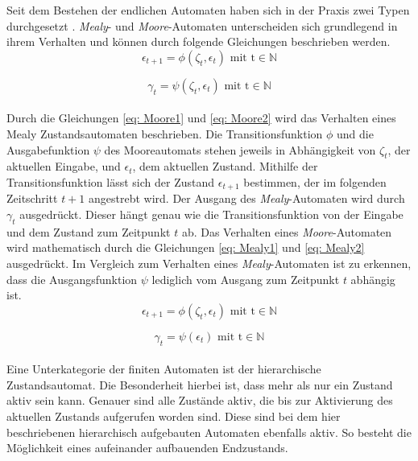 	Seit dem Bestehen der endlichen Automaten haben sich in der Praxis zwei Typen durchgesetzt \cite{mooremealy}. \textit{Mealy}- und \textit{Moore}-Automaten unterscheiden sich grundlegend in ihrem Verhalten und können durch folgende Gleichungen beschrieben werden.\\
	
	\begin{equation}
		\epsilon_{t+1}=\phi(\zeta_t,\epsilon_t)\text{    mit    t}\in\mathbb{N}
		\label{eq: Moore1}
	\end{equation}

	\begin{equation}
		\gamma_t=\psi(\zeta_t,\epsilon_t)\text{    mit    t}\in\mathbb{N}
		\label{eq: Moore2}
	\end{equation}
	\\
	Durch die Gleichungen \ref{eq: Moore1} und \ref{eq: Moore2} wird das Verhalten eines Mealy Zustandsautomaten beschrieben. Die Transitionsfunktion $\phi$ und die Ausgabefunktion $\psi$ des Mooreautomats stehen jeweils in Abhängigkeit von $\zeta_t $, der aktuellen Eingabe, und $\epsilon_t$, dem aktuellen Zustand. Mithilfe der Transitionsfunktion lässt sich der Zustand $\epsilon_{t+1}$ bestimmen, der im folgenden Zeitschritt $t+1$ angestrebt wird. Der Ausgang des \textit{Mealy}-Automaten wird durch $\gamma_t$ ausgedrückt. Dieser hängt genau wie die Transitionsfunktion von der Eingabe und dem Zustand zum Zeitpunkt $t$ ab. Das Verhalten eines \textit{Moore}-Automaten wird mathematisch durch die Gleichungen \ref{eq: Mealy1} und \ref{eq: Mealy2} ausgedrückt. Im Vergleich zum Verhalten eines \textit{Mealy}-Automaten ist zu erkennen, dass die Ausgangsfunktion $\psi$ lediglich vom Ausgang zum Zeitpunkt $t$ abhängig ist.  \cite{mooremealy}\\
	
	\begin{equation}
		\epsilon_{t+1}=\phi(\zeta_t,\epsilon_t)\text{    mit    t}\in\mathbb{N}
		\label{eq: Mealy1}
	\end{equation}
	
	\begin{equation}
		\gamma_t=\psi(\epsilon_t)\text{    mit    t}\in\mathbb{N}
		\label{eq: Mealy2}
	\end{equation}
	\\
	
	
	Eine Unterkategorie der finiten Automaten ist der hierarchische Zustandsautomat. Die Besonderheit hierbei ist, dass mehr als nur ein Zustand aktiv sein kann. Genauer sind alle Zustände aktiv, die bis zur Aktivierung des aktuellen Zustands aufgerufen worden sind. Diese sind bei dem hier beschriebenen hierarchisch aufgebauten Automaten ebenfalls aktiv. So besteht die Möglichkeit eines aufeinander aufbauenden Endzustands. \cite{hsm}
	
